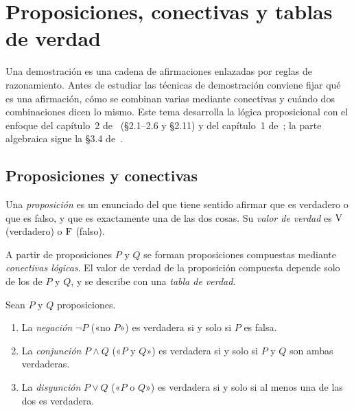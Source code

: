 \chapter{Proposiciones, conectivas y tablas de verdad}
\label{tema:1}

Una demostración es una cadena de afirmaciones enlazadas por reglas de razonamiento. Antes de estudiar las técnicas de demostración conviene fijar qué es una afirmación, cómo se combinan varias mediante conectivas y cuándo dos combinaciones dicen lo mismo. Este tema desarrolla la lógica proposicional con el enfoque del capítulo~2 de~\cite{hammack} (§2.1–2.6 y §2.11) y del capítulo~1 de~\cite{velleman}; la parte algebraica sigue la §3.4 de~\cite{mcs}.

\section{Proposiciones y conectivas}

\begin{definicion}[Proposición]\label{def:proposicion}
Una \emph{proposición} es un enunciado del que tiene sentido afirmar que es verdadero o que es falso, y que es exactamente una de las dos cosas. Su \emph{valor de verdad} es $\mathrm{V}$ (verdadero) o $\mathrm{F}$ (falso).
\end{definicion}

\addtocounter{definicion}{1}%

A partir de proposiciones $P$ y $Q$ se forman proposiciones compuestas mediante \emph{conectivas lógicas}. El valor de verdad de la proposición compuesta depende solo de los de $P$ y $Q$, y se describe con una \emph{tabla de verdad}.

\begin{definicion}\label{def:conectivas}
Sean $P$ y $Q$ proposiciones.
\begin{enumerate}
  \item La \emph{negación} $\neg P$ («no $P$») es verdadera si y solo si $P$ es falsa.
  \item La \emph{conjunción} $P\wedge Q$ («$P$ y $Q$») es verdadera si y solo si $P$ y $Q$ son ambas verdaderas.
  \item La \emph{disyunción} $P\vee Q$ («$P$ o $Q$») es verdadera si y solo si al menos una de las dos es verdadera.
\end{enumerate}
\end{definicion}

